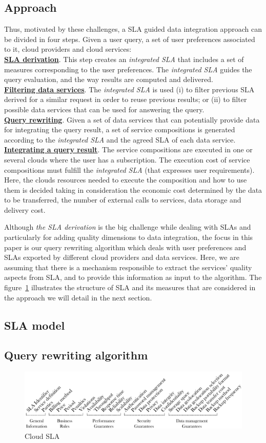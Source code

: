 \subsection{Approach}
Thus, motivated by these challenges, a SLA guided data integration approach can be divided in four steps. Given a user query, a set of user preferences associated to it, cloud providers and cloud services:
\\
\textbf{\underline{SLA derivation}}. This step creates an \textsl{integrated
SLA} that includes a set of measures corresponding to the user preferences. The \textsl{integrated SLA} guides the query evaluation, and the way results are computed and delivered. \\
\textbf{\underline{Filtering data services}}. The \textsl{integrated SLA} is used (i)
to filter previous SLA derived for a similar request in order to reuse previous results; or (ii) to filter possible data services that can be used for answering the query. \\
\textbf{\underline{Query rewriting}}. Given a set of data services that can
potentially provide data for integrating the query result, a set of service compositions is generated according to the \textsl{integrated SLA} and the agreed SLA of each data service. \\
\textbf{\underline{Integrating a query result}}. The service compositions are executed
in one or several clouds where the user has a subscription. The execution cost of service compositions must fulfill the \textsl{integrated SLA} (that expresses user requirements). Here, the clouds resources needed to execute the composition and how to use them is decided taking in consideration the economic cost determined by the data to be transferred, the number of external calls to services, data storage and delivery cost.

Although \textit{the SLA derivation} is the big challenge while dealing with
SLAs and particularly for adding quality dimensions to data integration, the
focus in this paper is our query rewriting algorithm which deals with user
preferences and SLAs exported by different cloud providers and data services.
Here, we are assuming that there is a mechanism responsible to extract the
services' quality aspects from SLA, and to provide this information as input to
the algorithm. The figure~\ref{fig:cloudsla} illustrates the structure of SLA
and its measures that are considered in the approach we will detail in the next
section.   

\subsection{SLA model}

\subsection{Query rewriting algorithm}

\begin{figure}[h!]
\center
\includegraphics[scale=0.57]{Cloud_SLA.pdf}
\caption{Cloud SLA}\label{fig:cloudsla}
\end{figure}
